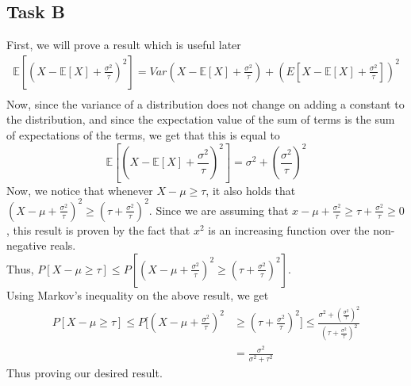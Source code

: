 \subsection{Task B}
First, we will prove a result which is useful later
\begin{align*}
    \mathbb{E}[\left(X-\mathbb{E}[X]+\frac{\sigma^2}{\tau}\right)^2]=Var(X-\mathbb{E}[X]+\frac{\sigma^2}{\tau})+\left(E[X-\mathbb{E}[X]+\frac{\sigma^2}{\tau}]\right)^2\\
\end{align*}
Now, since the variance of a distribution does not change on adding a constant to the distribution, and since the expectation value of the sum of terms is the sum of expectations of the terms, we get that this is equal to 
\[
    \mathbb{E}[\left(X-\mathbb{E}[X]+\frac{\sigma^2}{\tau}\right)^2]=\sigma^2+\left(\frac{\sigma^2}{\tau}\right)^2
\]
Now, we notice that whenever $X-\mu \ge \tau$, it also holds that $\left(X-\mu+\frac{\sigma^2}{\tau}\right)^2\ge\left(\tau +\frac{\sigma^2}{\tau}\right)^2$. Since we are assuming that $x-\mu+\frac{\sigma^2}{\tau}\ge \tau+\frac{\sigma^2}{\tau} \ge 0$, this result is proven by the fact that $x^2$ is an increasing function over the non-negative reals.\\
Thus, $P[X-\mu \ge \tau] \le P[\left(X-\mu+\frac{\sigma^2}{\tau}\right)^2\ge\left(\tau +\frac{\sigma^2}{\tau}\right)^2]$.\\
Using Markov's inequality on the above result, we get
\begin{align*}
    P[X-\mu \ge \tau] \le P[\left(X-\mu+\frac{\sigma^2}{\tau}\right)^2&\ge\left(\tau +\frac{\sigma^2}{\tau}\right)^2]\le \frac{\sigma^2+\left(\frac{\sigma^2}{\tau}\right)^2}{\left(\tau+\frac{\sigma^2}{\tau}\right)^2}\\
    &=\frac{\sigma^2}{\sigma^2+\tau^2}
\end{align*}
Thus proving our desired result.
